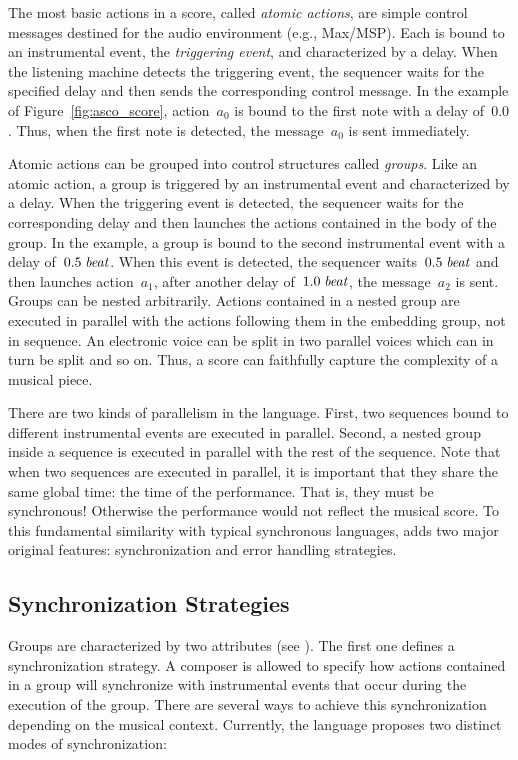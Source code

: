 \documentclass[preprint]{sigplanconf}
\begin{document}
The most basic actions in a score, called \emph{atomic actions}, are
simple control messages destined for the audio environment (e.g.,
Max/MSP).  Each is bound to an instrumental event, the
\emph{triggering event}, and characterized by a delay. When the
listening machine detects the triggering event, the sequencer waits
for the specified delay and then sends the corresponding control
message.  In the example of Figure~\ref{fig:asco_score}, action~$a_0$
is bound to the first note with a delay of~$0.0$. Thus, when the first
note is detected, the message~$a_0$ is sent immediately.

Atomic actions can be grouped into control structures called
\emph{groups}. Like an atomic action, a group is triggered by an
instrumental event and characterized by a delay. When the triggering
event is detected, the sequencer waits for the corresponding delay and
then launches the actions contained in the body of the group. In the
example, a group is bound to the second instrumental event with a
delay of~${0.5 \; {{\mbox{\emph{beat}}}}}$. When this event is detected, the
sequencer waits~${0.5 \; {{\mbox{\emph{beat}}}}}$ and then launches action~$a_1$,
after another delay of~${1.0 \; {{\mbox{\emph{beat}}}}}$, the message~$a_2$ is sent.
Groups can be nested arbitrarily. Actions contained in a nested group
are executed in parallel with the actions following them in the
embedding group, not in sequence. An electronic voice can be split in
two parallel voices which can in turn be split and so on. Thus, a
score can faithfully capture the complexity of a musical piece.

There are two kinds of parallelism in the language. First, two
sequences bound to different instrumental events are executed in
parallel. Second, a nested group inside a sequence is executed in
parallel with the rest of the sequence. Note that when two sequences
are executed in parallel, it is important that they share the same
global time: the time of the performance.  That is, they must be
synchronous!  Otherwise the performance would not reflect the musical
score.  To this fundamental similarity with typical synchronous
languages, \Antescofo{} adds two major original features:
synchronization and error handling strategies.

\subsection{Synchronization Strategies}
\label{sec:ante_synchro}
Groups are characterized by two attributes (see \cite{ContEGJ12icmc}).
The first one defines a synchronization strategy. A composer is
allowed to specify how actions contained in a group will synchronize
with instrumental events that occur during the execution of the
group. There are several ways to achieve this synchronization
depending on the musical context. Currently, the language proposes two
distinct modes of synchronization:
\end{document}
